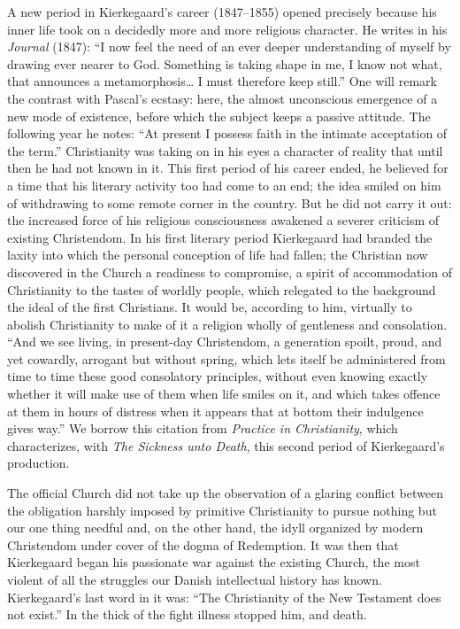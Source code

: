 \documentclass[12pt,a4paper]{article}
\newcommand{\opage}[1]{\marginnote{\footnotesize\textit{[#1]}}}
\begin{document}
A new period in Kierkegaard's career (1847--1855) opened precisely because his
inner life took on a decidedly more and more religious character. He writes in
his \emph{Journal} (1847): ``I now feel the need of an ever deeper
understanding of myself by drawing ever
\opage{229}nearer to God. Something is taking shape in me, I know not what, that announces
a metamorphosis\ldots{} I must therefore keep still.'' One will remark the
contrast with Pascal's ecstasy: here, the almost unconscious emergence of a new
mode of existence, before which the subject keeps a passive attitude. The
following year he notes: ``At present I possess faith in the intimate acceptation
of the term.'' Christianity was taking on in his eyes a character of reality
that until then he had not known in it. This first period of his career ended,
he believed for a time that his literary activity too had come to an end; the
idea smiled on him of withdrawing to some remote corner in the country. But he
did not carry it out: the increased force of his religious consciousness
awakened a severer criticism of existing Christendom. In his first literary
period Kierkegaard had branded the laxity into which the personal conception of
life had fallen; the Christian now discovered in the Church a readiness to
compromise, a spirit of accommodation of Christianity to the tastes of worldly
people, which relegated to the background the ideal of the first Christians. It
would be, according to him, virtually to abolish Christianity to make of it a
religion wholly of gentleness and consolation. ``And we see living, in present-day
Christendom, a generation spoilt, proud, and yet cowardly, arrogant but without
spring, which lets itself be administered from time to time these good
consolatory principles, without even knowing exactly whether it will make use of
them when life smiles on it, and which takes offence at them in hours of
distress when it appears that at bottom their indulgence gives way.'' We borrow
this citation from \emph{Practice in Christianity}, which characterizes, with
\emph{The Sickness unto Death}, this second period of Kierkegaard's production.

The official Church did not take up the observation of a glaring conflict
between the obligation harshly imposed by primitive Christianity to pursue
nothing but our one thing needful and, on the other hand, the idyll organized by
modern Christendom under cover of the dogma of Redemption. It was then that
Kierkegaard began his passionate war against the existing Church, the most
violent of all the struggles our Danish intellectual history has known.
Kierkegaard's last word in it was: ``The Christianity of the New Testament does
not exist.'' In the thick of the fight illness stopped him, and death.
\end{document}
